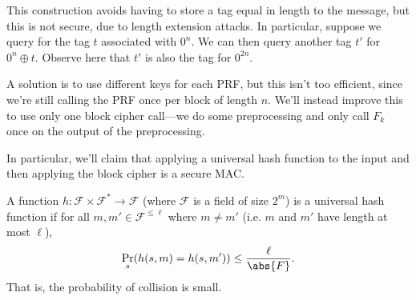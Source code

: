 \begin{center}
\end{center}

This construction avoids having to store a tag equal in length to the message, but this is not secure, due to length extension attacks. In particular, suppose we query for the tag $t$ associated with $0^n$. We can then query another tag $t'$ for $0^n \oplus t$. Observe here that $t'$ is also the tag for $0^{2n}$.

A solution is to use different keys for each PRF, but this isn't too efficient, since we're still calling the PRF once per block of length $n$. We'll instead improve this to use only one block cipher call---we do some preprocessing and only call $F_k$ once on the output of the preprocessing.

In particular, we'll claim that applying a universal hash function to the input and then applying the block cipher is a secure MAC.

\begin{definition}
    A function $h : \mathcal{F} \times \mathcal{F}^* \to \mathcal{F}$ (where $\mathcal{F}$ is a field of size $2^m$) is a universal hash function if for all $m, m' \in \mathcal{F}^{\le \ell}$ where $m \neq m'$ (i.e. $m$ and $m'$ have length at most $\ell$),
    \[
        \Pr_s(h(s, m) = h(s, m')) \le \frac{\ell}{\abs{F}}
    .\]
    That is, the probability of collision is small.
\end{definition}

